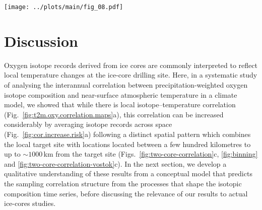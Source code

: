 \documentclass[cp, manuscript]{copernicus}
\begin{document}
\begin{figure*}[t]%
\centering
\texttt{[image: ../plots/main/fig\_08.pdf]}
\caption{%
  Gain in correlation and risk of adverse sampling. \textbf{(a)} The average
  correlation with the target temperature at the EDML (red) and Vostok (blue)
  sites depending on the number of locations, $N$, used for averaging the
  $\delta^{18}\mathrm{O}^{\mathrm{(pw)}}$ time series. Sampling is performed
  either locally from the innermost ring only (dashed lines), or from all
  possible individual combinations of locations for the respective optimal ring
  combination determined for each $N$ (solid lines). Compared to the local
  samples which show virtually no increase with the number of sampled locations,
  the correlation increases markedly with $N$ when sampling from the optimal
  rings, as highlighted by the shaded area. \textbf{(b)} Histogram of individual
  correlations for sampling from the optimal ring combination when averaging
  $N=3$ locations compared to the correlation (vertical lines) for sampling from
  the innermost ring only, displayed for the EDML (red) and Vostok (blue) target
  sites. For more than $90\,\%$ of the optimal ring combination samples, the
  correlation is higher than the local value.}
\label{fig:cor.increase.risk}%
\end{figure*}%

\section{Discussion}\label{discussion}

Oxygen isotope records derived from ice cores are commonly interpreted to
reflect local temperature changes at the ice-core drilling site. Here, in a
systematic study of analysing the interannual correlation between
precipitation-weighted oxygen isotope composition and near-surface atmospheric
temperature in a climate model, we showed that while there is local
isotope--temperature correlation (Fig.~\ref{fig:t2m.oxy.correlation.maps}a),
this correlation can be increased considerably by averaging isotope records
across space (Fig.~\ref{fig:cor.increase.risk}a) following a distinct spatial
pattern which combines the local target site with locations located between a
few hundred kilometres to up to $\sim1000$\,km from the target site
(Figs.~\ref{fig:two-core-correlation}c, \ref{fig:binning} and
\ref{fig:two-core-correlation-vostok}c). In the next section, we develop a
qualitative understanding of these results from a conceptual model that predicts
the sampling correlation structure from the processes that shape the isotopic
composition time series, before discussing the relevance of our results to
actual ice-cores studies.
\end{document}

